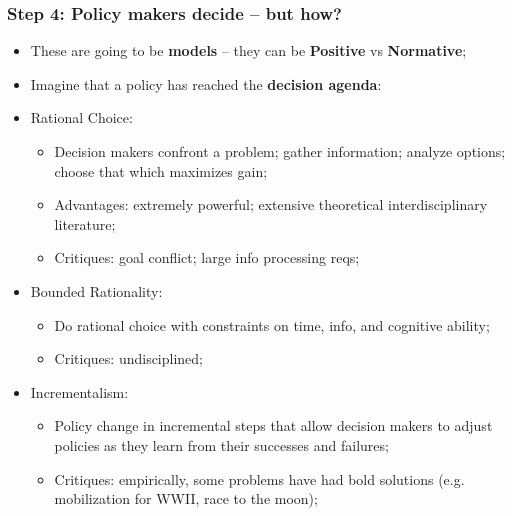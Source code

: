 \documentclass[aspectratio=169]{beamer}
\theoremstyle{principle}
\begin{document}
\begin{frame}
\frametitle{Step 4: Policy makers decide -- but how?}
\begin{itemize}
\item These are going to be \textbf{models} -- they can be \textbf{Positive} vs \textbf{Normative};
\item Imagine that a policy has reached the \textbf{decision agenda}:
\item Rational Choice:
\begin{itemize}
\item Decision makers confront a problem; gather information; analyze options; choose that which maximizes gain;
\item Advantages: extremely powerful; extensive theoretical interdisciplinary literature;
\item Critiques: goal conflict; large info processing reqs; 
\end{itemize}
\item Bounded Rationality:
\begin{itemize}
\item Do rational choice with constraints on time, info, and cognitive ability;
\item Critiques: undisciplined;
\end{itemize}
\item Incrementalism:
\begin{itemize}
\item Policy change in incremental steps that allow decision makers to adjust policies as they learn from their successes and failures;
\item Critiques: empirically, some problems have had bold solutions (e.g. mobilization for WWII, race to the moon); 
\end{itemize}
\end{itemize}
\end{frame}
\end{document}
